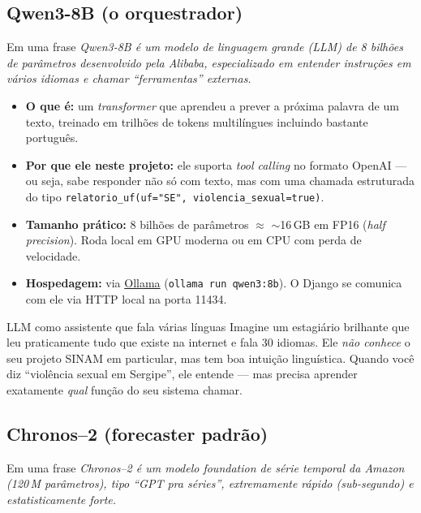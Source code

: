 \documentclass[11pt,a4paper]{article}
\newcommand{\code}[1]{\texttt{\small #1}}
\begin{document}
\subsection{Qwen3-8B (o orquestrador)}

\begin{infobox}{Em uma frase}
\emph{Qwen3-8B é um modelo de linguagem grande (LLM) de 8 bilhões de
parâmetros desenvolvido pela Alibaba, especializado em entender
instruções em vários idiomas e chamar ``ferramentas'' externas.}
\end{infobox}

\begin{itemize}[leftmargin=*]
\item \textbf{O que é:} um \emph{transformer} que aprendeu a prever a
próxima palavra de um texto, treinado em trilhões de tokens
multilíngues incluindo bastante português.

\item \textbf{Por que ele neste projeto:} ele suporta \emph{tool
calling} no formato OpenAI --- ou seja, sabe responder não só com
texto, mas com uma chamada estruturada do tipo
\code{relatorio\_uf(uf="SE", violencia\_sexual=true)}.

\item \textbf{Tamanho prático:} 8 bilhões de parâmetros $\approx$
$\sim$16\,GB em FP16 (\emph{half precision}). Roda local em GPU
moderna ou em CPU com perda de velocidade.

\item \textbf{Hospedagem:} via \href{https://ollama.com}{Ollama}
(\code{ollama run qwen3:8b}). O Django se comunica com ele via HTTP
local na porta 11434.
\end{itemize}

\begin{analogia}{LLM como assistente que fala várias línguas}
Imagine um estagiário brilhante que leu praticamente tudo que existe
na internet e fala 30 idiomas. Ele \emph{não conhece} o seu projeto
SINAM em particular, mas tem boa intuição linguística. Quando você
diz ``violência sexual em Sergipe'', ele entende --- mas precisa
aprender exatamente \emph{qual} função do seu sistema chamar.
\end{analogia}

\subsection{Chronos--2 (forecaster padrão)}

\begin{infobox}{Em uma frase}
\emph{Chronos--2 é um modelo \emph{foundation} de série temporal da
Amazon (120\,M parâmetros), tipo ``GPT pra séries'', extremamente
rápido (sub-segundo) e estatisticamente forte.}
\end{infobox}
\end{document}
